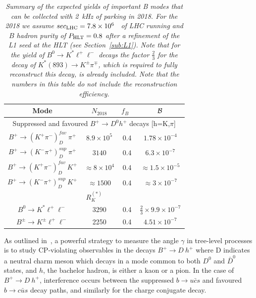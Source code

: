 \documentclass[a4paper,11pt]{article}
\begin{document}
\begin{table}[htb]
\label{tab:yields}
\footnotesize\center
\caption{\it Summary of the expected yields of important B modes that can be collected with 2~kHz of parking in 2018. For the 2018 we assume $sec_{\rm LHC}=7.8\times10^6$~\cite{scoutingW} of LHC running and $B$ hadron purity of $P_{\rm HLT}=0.8$ after a refinement of the L1 seed at the HLT (see Section~\ref{sub:L1}). Note that for the yield of $B^0\rightarrow K^*\ell^+\ell^-$ decays the factor $\frac{2}{3}$ for the decay of $K^*(893) \rightarrow K^{\pm} \pi^{\mp}$, which is required to fully reconstruct this decay, is already included. Note that the numbers in this table do not include the reconstruction efficiency.}
\vspace{0.1in}
\begin{tabular}{ |c|c|c|c| }
 \hline
Mode & $N_{2018}$ & $f_B$~\cite{FB} & ${\cal B}$   \\ \hline \hline 
\multicolumn{4}{|c|}{Suppressed and favoured $B^{+} \rightarrow D^0 h^{+}$ decays [h=K,$\pi$]} \\ \hline
$B^{+} \rightarrow (K^{+}  \pi^{-})_D^{fav} ~ \pi^{+} $&    $8.9\times 10^{5}$& 0.4  & $1.78 \times 10^{-4}$ \cite{PDG0}  \\ \hline
$B^{+}  \rightarrow (K^{-}  \pi^{+})_D^{sup}~ \pi^{+}$ &   $3140$& 0.4  & $6.3\times 10^{-7}$ \cite{PDG0}  \\ \hline \hline
$B^{+} \rightarrow (K^{+}  \pi^{-})_D^{fav}~ K^{+}$ &    $\approx 8 \times 10^{4}$& 0.4  & $\approx 1.5 \times 10^{-5}$ \cite{PDG0}  \\ \hline
$B^{+}  \rightarrow (K^{-}  \pi^{+})_D^{sup}~ K^{+} $&   $\approx 1500 $& 0.4  & $\approx 3 \times 10^{-7}$ \cite{PDG0}  \\ \hline \hline
\multicolumn{4}{|c|}{$R_K^{(*)}$} \\ \hline
$B^0\rightarrow K^* \ell^+\ell^-$ &   3290 & 0.4  & $\frac{2}{3} \times 9.9 \times 10^{-7}$ \cite{PDG0}  \\ \hline
$B^{\pm}\rightarrow K^{\pm} \ell^+\ell^-$ &  2250  & 0.4  & $4.51\times 10^{-7}$ \cite{PDG+}  \\ \hline
 \end{tabular}
\end{table}

As outlined in~\cite{Atwood:1996ci}, a powerful strategy to measure the angle $\gamma$ in tree-level processes is to study CP-violating observables in the decays $B^{+} \rightarrow D~h^{+}$  where D indicates a neutral charm meson which decays in a mode common to both $D^0$ and $\bar{D}^0$ states, and $h$, the bachelor hadron, is either a kaon or a pion. In the case of  $B^{+} \rightarrow D~h^{+}$, interference occurs between the suppressed $b\rightarrow u \bar{c} s$ and favoured $b\rightarrow c \bar{u} s$ decay paths, and similarly for the charge conjugate decay.  
\end{document}
